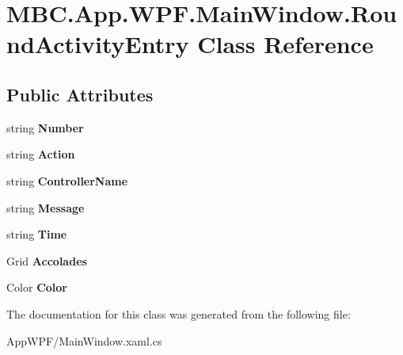 \hypertarget{class_m_b_c_1_1_app_1_1_w_p_f_1_1_main_window_1_1_round_activity_entry}{\section{M\-B\-C.\-App.\-W\-P\-F.\-Main\-Window.\-Round\-Activity\-Entry Class Reference}
\label{class_m_b_c_1_1_app_1_1_w_p_f_1_1_main_window_1_1_round_activity_entry}
}
\subsection*{Public Attributes}
\begin{DoxyCompactItemize}
\item 
\hypertarget{class_m_b_c_1_1_app_1_1_w_p_f_1_1_main_window_1_1_round_activity_entry_a437fe044effdd62e319ca540440b2145}{string {\bfseries Number}}\label{class_m_b_c_1_1_app_1_1_w_p_f_1_1_main_window_1_1_round_activity_entry_a437fe044effdd62e319ca540440b2145}

\item 
\hypertarget{class_m_b_c_1_1_app_1_1_w_p_f_1_1_main_window_1_1_round_activity_entry_a85eb54d68660d417e95f14c1ec0e342c}{string {\bfseries Action}}\label{class_m_b_c_1_1_app_1_1_w_p_f_1_1_main_window_1_1_round_activity_entry_a85eb54d68660d417e95f14c1ec0e342c}

\item 
\hypertarget{class_m_b_c_1_1_app_1_1_w_p_f_1_1_main_window_1_1_round_activity_entry_ad6382e0a107d1bfde664311e1cc7d1ac}{string {\bfseries Controller\-Name}}\label{class_m_b_c_1_1_app_1_1_w_p_f_1_1_main_window_1_1_round_activity_entry_ad6382e0a107d1bfde664311e1cc7d1ac}

\item 
\hypertarget{class_m_b_c_1_1_app_1_1_w_p_f_1_1_main_window_1_1_round_activity_entry_a839c0ba9052f3ca0653f475ef731a7cf}{string {\bfseries Message}}\label{class_m_b_c_1_1_app_1_1_w_p_f_1_1_main_window_1_1_round_activity_entry_a839c0ba9052f3ca0653f475ef731a7cf}

\item 
\hypertarget{class_m_b_c_1_1_app_1_1_w_p_f_1_1_main_window_1_1_round_activity_entry_af2ecab33636429e42f006c9ac3482efe}{string {\bfseries Time}}\label{class_m_b_c_1_1_app_1_1_w_p_f_1_1_main_window_1_1_round_activity_entry_af2ecab33636429e42f006c9ac3482efe}

\item 
\hypertarget{class_m_b_c_1_1_app_1_1_w_p_f_1_1_main_window_1_1_round_activity_entry_afe7c5d1772c761dcb1c195d8639e077b}{Grid {\bfseries Accolades}}\label{class_m_b_c_1_1_app_1_1_w_p_f_1_1_main_window_1_1_round_activity_entry_afe7c5d1772c761dcb1c195d8639e077b}

\item 
\hypertarget{class_m_b_c_1_1_app_1_1_w_p_f_1_1_main_window_1_1_round_activity_entry_ade7d4c19c03703e8f2503259666cab7c}{Color {\bfseries Color}}\label{class_m_b_c_1_1_app_1_1_w_p_f_1_1_main_window_1_1_round_activity_entry_ade7d4c19c03703e8f2503259666cab7c}

\end{DoxyCompactItemize}


The documentation for this class was generated from the following file\-:\begin{DoxyCompactItemize}
\item 
App\-W\-P\-F/Main\-Window.\-xaml.\-cs\end{DoxyCompactItemize}
